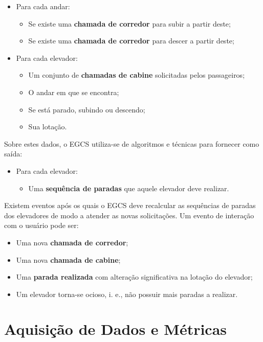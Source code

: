 \begin{itemize}
  \item Para cada andar:
  \begin{itemize}
    \item Se existe uma \textbf{chamada de corredor} para subir a partir deste;
    \item Se existe uma \textbf{chamada de corredor} para descer a partir deste;
  \end{itemize}
  \item Para cada elevador:
  \begin{itemize}
    \item Um conjunto de \textbf{chamadas de cabine} solicitadas pelos passageiros;
    \item O andar em que se encontra;
    \item Se está parado, subindo ou descendo;
    \item Sua lotação.
  \end{itemize}
\end{itemize}

Sobre estes dados, o EGCS utiliza-se de algoritmos e técnicas para fornecer como saída:

\begin{itemize}
  \item Para cada elevador:
  \begin{itemize}
    \item Uma \textbf{sequência de paradas} que aquele elevador deve realizar.
  \end{itemize}
\end{itemize}

Existem eventos após os quais o EGCS deve recalcular as sequências de paradas dos elevadores de modo a atender as novas solicitações. Um evento de interação com o usuário pode ser:

\begin{itemize}
  \item Uma nova \textbf{chamada de corredor};
  \item Uma nova \textbf{chamada de cabine};
  \item Uma \textbf{parada realizada} com alteração significativa na lotação do elevador;
  \item Um elevador torna-se ocioso, i. e., não possuir mais paradas a realizar.
\end{itemize}

\section{Aquisição de Dados e Métricas}

